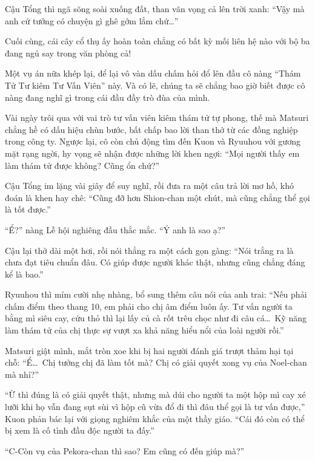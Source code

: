 \documentclass[../main.tex]{subfiles}
\begin{document}
Cậu Tổng thì ngã sõng soài xuống đất, than vãn vọng cả lên trời xanh: ``Vậy mà anh cứ tưởng có chuyện gì ghê gớm lắm chứ\dots''

Cuối cùng, cái cây cổ thụ ấy hoàn toàn chẳng có bất kỳ mối liên hệ nào với bộ ba đang ngủ say trong văn phòng cả!

Một vụ án nữa khép lại, để lại vô vàn dấu chấm hỏi đổ lên đầu cô nàng ``Thám Tử Tư kiêm Tư Vấn Viên'' này. Và có lẽ, chúng ta sẽ chẳng bao giờ biết được cô nàng đang nghĩ gì trong cái đầu đầy trò đùa của mình.


\omk

Vài ngày trôi qua với vai trò tư vấn viên kiêm thám tử tự phong, thế mà Matsuri chẳng hề có dấu hiệu chùn bước, bất chấp bao lời than thở từ các đồng nghiệp trong công ty. Ngược lại, cô còn chủ động tìm đến Kuon và Ryuuhou với gương mặt rạng ngời, hy vọng sẽ nhận được những lời khen ngợi: ``Mọi người thấy em làm thám tử được không? Cũng ổn chứ?''

Cậu Tổng im lặng vài giây để suy nghĩ, rồi đưa ra một câu trả lời mơ hồ, khó đoán là khen hay chê: ``Cũng đỡ hơn Shion-chan một chút, mà cũng chẳng thể gọi là tốt được.''

``Ể?'' nàng Lễ hội nghiêng đầu thắc mắc. ``Ý anh là sao ạ?''

Cậu lại thở dài một hơi, rồi nói thẳng ra một cách gọn gàng: ``Nói trắng ra là chưa đạt tiêu chuẩn đâu. Có giúp được người khác thật, nhưng cũng chẳng đáng kể là bao.''

Ryuuhou thì mỉm cười nhẹ nhàng, bổ sung thêm câu nói của anh trai: ``Nếu phải chấm điểm theo thang 10, em phải cho chị âm điểm luôn ấy. Tư vấn người ta bằng mì siêu cay, cứu thỏ thì lại lấy củ cà rốt trêu chọc như đi câu cá\dots\ Kỹ năng làm thám tử của chị thực sự vượt xa khả năng hiểu nổi của loài người rồi.''

Matsuri giật mình, mắt tròn xoe khi bị hai người đánh giá trượt thảm hại tại chỗ: ``Ể\dots\ Chị tưởng chị đã làm tốt mà? Chị có giải quyết xong vụ của Noel-chan mà nhỉ?''

``Ừ thì đúng là có giải quyết thật, nhưng mà dúi cho người ta một hộp mì cay xé lưỡi khi họ vẫn đang sụt sùi vì hộp cũ vừa đổ đi thì đâu thể gọi là tư vấn được,'' Kuon phản bác lại với giọng nghiêm khắc của một thầy giáo. ``Cái đó còn có thể bị xem là cố tình đầu độc người ta đấy.''

``C-Còn vụ của Pekora-chan thì sao? Em cũng có đến giúp mà?''
\end{document}
